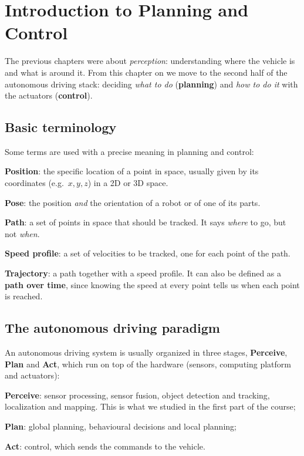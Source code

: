 \section{Introduction to Planning and Control}

The previous chapters were about \emph{perception}: understanding where the vehicle is and what is around it. From this chapter on we move to the second half of the autonomous driving stack: deciding \emph{what to do} (\textbf{planning}) and \emph{how to do it} with the actuators (\textbf{control}).

\subsection{Basic terminology}
Some terms are used with a precise meaning in planning and control:
\begin{compactitemize}
    \item \textbf{Position}: the specific location of a point in space, usually given by its coordinates (e.g.\ $x, y, z$) in a 2D or 3D space.
    \item \textbf{Pose}: the position \emph{and} the orientation of a robot or of one of its parts.
    \item \textbf{Path}: a set of points in space that should be tracked. It says \emph{where} to go, but not \emph{when}.
    \item \textbf{Speed profile}: a set of velocities to be tracked, one for each point of the path.
    \item \textbf{Trajectory}: a path together with a speed profile. It can also be defined as a \textbf{path over time}, since knowing the speed at every point tells us when each point is reached.
\end{compactitemize}

\subsection{The autonomous driving paradigm}
An autonomous driving system is usually organized in three stages, \textbf{Perceive}, \textbf{Plan} and \textbf{Act}, which run on top of the hardware (sensors, computing platform and actuators):
\begin{compactitemize}
    \item \textbf{Perceive}: sensor processing, sensor fusion, object detection and tracking, localization and mapping. This is what we studied in the first part of the course;
    \item \textbf{Plan}: global planning, behavioural decisions and local planning;
    \item \textbf{Act}: control, which sends the commands to the vehicle.
\end{compactitemize}

